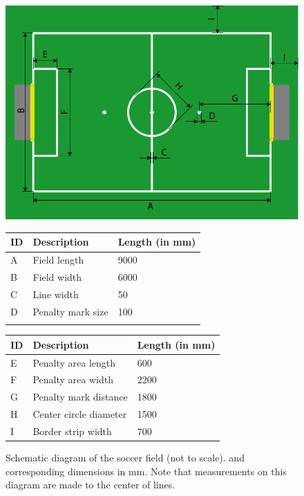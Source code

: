 \documentclass[12pt]{article}
\begin{document}
\begin{figure}[b!]
\centerline{\includegraphics[width=\columnwidth]{figs/fieldDimensions2013.pdf}}
\vspace{1ex}
\begin{tabular}{| l | l | l |}
ID & Description & Length (in mm) \\
\hline
A & Field length & 9000 \\
\hline
B & Field width & 6000 \\
\hline
C & Line width & 50 \\ 
\hline
D & Penalty mark size & 100 \\ 
\hline
 &  &  \\
\end{tabular}
\begin{tabular}{|l|l|l|}
ID & Description & Length (in mm) \\
\hline
E & Penalty area length & 600 \\
\hline
F & Penalty area width & 2200 \\
\hline
G & Penalty mark distance & 1800 \\ 
\hline
H & Center circle diameter & 1500 \\
\hline
I & Border strip width & 700 \\
\end{tabular}
\caption{Schematic diagram of the soccer field (not to scale). and corresponding dimensions in mm.  Note that measurements on this diagram are made to the center of lines.} \label{fig:field_dim}
\end{figure}
\end{document}
